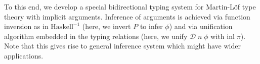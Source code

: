 \documentclass[manuscript,screen,review]{acmart}
\begin{document}
To this end, we develop a special bidirectional typing system \cite{bidir} for
Martin-L\"of type theory with implicit arguments. Inference of arguments is
achieved via function inversion as in $\mathrm{Haskell}^{-1}$ \cite{haskell}
(here, we invert $P$ to infer $\phi$) and via unification algorithm embedded in
the typing relations (here, we unify $\mathcal{D} \; n \; \phi$ with
$\mathrm{inl} \; \pi$). Note that this gives rise to general inference system
which might have wider applications.



\end{document}
